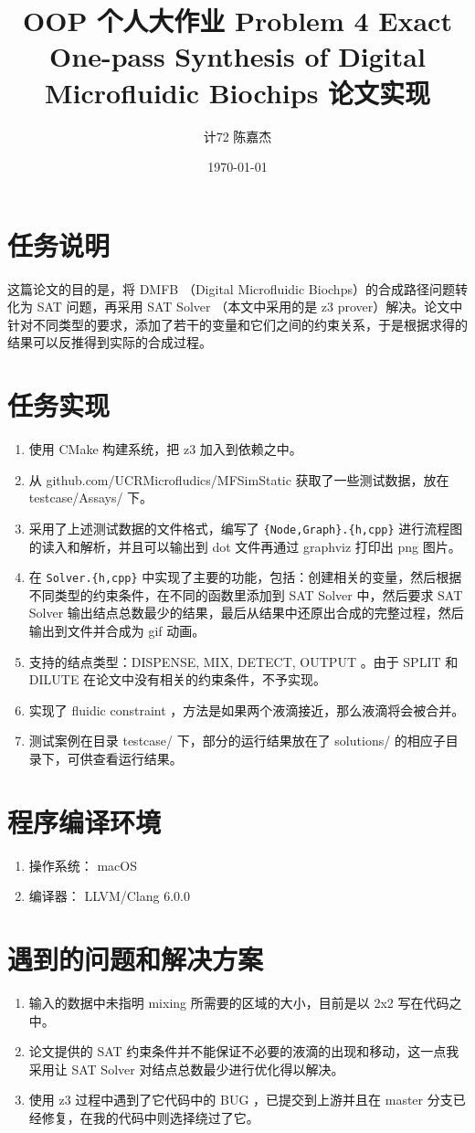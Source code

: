 \documentclass[11pt]{article}
\author{计72 陈嘉杰}
\date{\today}
\title{OOP 个人大作业 Problem 4 Exact One-pass Synthesis of Digital Microfluidic Biochips 论文实现}
\begin{document}
\maketitle
\tableofcontents

\section{任务说明}
\label{sec:orgd637b02}
这篇论文的目的是，将 DMFB （Digital Microfluidic Biochps）的合成路径问题转化为 SAT 问题，再采用 SAT Solver （本文中采用的是 z3 prover）解决。论文中针对不同类型的要求，添加了若干的变量和它们之间的约束关系，于是根据求得的结果可以反推得到实际的合成过程。

\section{任务实现}
\label{sec:org56536c1}
\begin{enumerate}
\item 使用 CMake 构建系统，把 z3 加入到依赖之中。
\item 从 github.com/UCRMicrofludics/MFSimStatic 获取了一些测试数据，放在 testcase/Assays/ 下。
\item 采用了上述测试数据的文件格式，编写了 \texttt{\{Node,Graph\}.\{h,cpp\}} 进行流程图的读入和解析，并且可以输出到 dot 文件再通过 graphviz 打印出 png 图片。
\item 在 \texttt{Solver.\{h,cpp\}} 中实现了主要的功能，包括：创建相关的变量，然后根据不同类型的约束条件，在不同的函数里添加到 SAT Solver 中，然后要求 SAT Solver 输出结点总数最少的结果，最后从结果中还原出合成的完整过程，然后输出到文件并合成为 gif 动画。
\item 支持的结点类型：DISPENSE, MIX, DETECT, OUTPUT 。由于 SPLIT 和 DILUTE 在论文中没有相关的约束条件，不予实现。
\item 实现了 fluidic constraint ，方法是如果两个液滴接近，那么液滴将会被合并。
\item 测试案例在目录 testcase/ 下，部分的运行结果放在了 solutions/ 的相应子目录下，可供查看运行结果。
\end{enumerate}

\section{程序编译环境}
\label{sec:org7afc7e1}
\begin{enumerate}
\item 操作系统： macOS
\item 编译器： LLVM/Clang 6.0.0
\end{enumerate}

\section{遇到的问题和解决方案}
\label{sec:orgc5999f0}
\begin{enumerate}
\item 输入的数据中未指明 mixing 所需要的区域的大小，目前是以 2x2 写在代码之中。
\item 论文提供的 SAT 约束条件并不能保证不必要的液滴的出现和移动，这一点我采用让 SAT Solver 对结点总数最少进行优化得以解决。
\item 使用 z3 过程中遇到了它代码中的 BUG ，已提交到上游并且在 master 分支已经修复，在我的代码中则选择绕过了它。
\end{enumerate}
\end{document}
